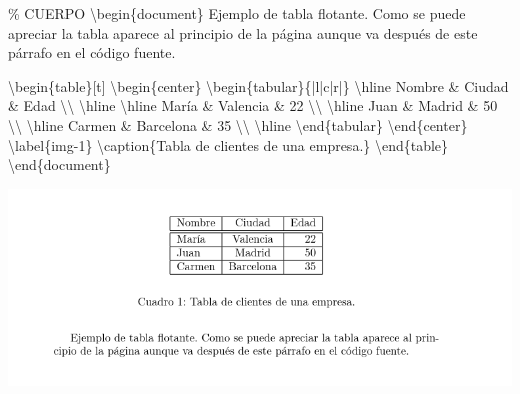 \documentclass[
  a4paper,
]{scrreport}
\newenvironment{Shaded}{\begin{snugshade}}{\end{snugshade}}
\newcommand{\CommentTok}[1]{\textcolor[rgb]{0.37,0.37,0.37}{#1}}
\newcommand{\ExtensionTok}[1]{\textcolor[rgb]{0.00,0.23,0.31}{#1}}
\newcommand{\FunctionTok}[1]{\textcolor[rgb]{0.28,0.35,0.67}{#1}}
\newcommand{\KeywordTok}[1]{\textcolor[rgb]{0.00,0.23,0.31}{#1}}
\newcommand{\NormalTok}[1]{\textcolor[rgb]{0.00,0.23,0.31}{#1}}
\newcommand{\OperatorTok}[1]{\textcolor[rgb]{0.37,0.37,0.37}{#1}}
\begin{document}
\begin{Shaded}
\begin{Highlighting}[]
\CommentTok{\% CUERPO}
\KeywordTok{\textbackslash{}begin}\NormalTok{\{}\ExtensionTok{document}\NormalTok{\}}
\NormalTok{Ejemplo de tabla flotante. Como se puede apreciar la tabla aparece al }
\NormalTok{principio de la página aunque va después de este párrafo en el código }
\NormalTok{fuente.}

\KeywordTok{\textbackslash{}begin}\NormalTok{\{}\ExtensionTok{table}\NormalTok{\}[t]}
\KeywordTok{\textbackslash{}begin}\NormalTok{\{}\ExtensionTok{center}\NormalTok{\}}
\KeywordTok{\textbackslash{}begin}\NormalTok{\{}\ExtensionTok{tabular}\NormalTok{\}\{|l|c|r|\}}
\FunctionTok{\textbackslash{}hline}
\NormalTok{Nombre }\OperatorTok{\&}\NormalTok{ Ciudad }\OperatorTok{\&}\NormalTok{ Edad }\FunctionTok{\textbackslash{}\textbackslash{}} 
\FunctionTok{\textbackslash{}hline}
\FunctionTok{\textbackslash{}hline}
\NormalTok{María }\OperatorTok{\&}\NormalTok{ Valencia }\OperatorTok{\&}\NormalTok{ 22 }\FunctionTok{\textbackslash{}\textbackslash{}}
\FunctionTok{\textbackslash{}hline}
\NormalTok{Juan }\OperatorTok{\&}\NormalTok{ Madrid }\OperatorTok{\&}\NormalTok{ 50 }\FunctionTok{\textbackslash{}\textbackslash{}}
\FunctionTok{\textbackslash{}hline}
\NormalTok{Carmen }\OperatorTok{\&}\NormalTok{ Barcelona }\OperatorTok{\&}\NormalTok{ 35 }\FunctionTok{\textbackslash{}\textbackslash{}}
\FunctionTok{\textbackslash{}hline}
\KeywordTok{\textbackslash{}end}\NormalTok{\{}\ExtensionTok{tabular}\NormalTok{\}}
\KeywordTok{\textbackslash{}end}\NormalTok{\{}\ExtensionTok{center}\NormalTok{\}}
\KeywordTok{\textbackslash{}label}\NormalTok{\{}\ExtensionTok{img{-}1}\NormalTok{\}}
\FunctionTok{\textbackslash{}caption}\NormalTok{\{Tabla de clientes de una empresa.\}}
\KeywordTok{\textbackslash{}end}\NormalTok{\{}\ExtensionTok{table}\NormalTok{\}}
\KeywordTok{\textbackslash{}end}\NormalTok{\{}\ExtensionTok{document}\NormalTok{\}}
\end{Highlighting}
\end{Shaded}

\begin{tcolorbox}[enhanced jigsaw, bottomrule=.15mm, leftrule=.75mm, opacityback=0, titlerule=0mm, bottomtitle=1mm, colbacktitle=quarto-callout-note-color!10!white, arc=.35mm, toprule=.15mm, colframe=quarto-callout-note-color-frame, title={Salida}, coltitle=black, colback=white, breakable, toptitle=1mm, rightrule=.15mm, left=2mm, opacitybacktitle=0.6]

\includegraphics{./img/entornos-flotantes/tabla-flotante.png}

\end{tcolorbox}
\end{document}
